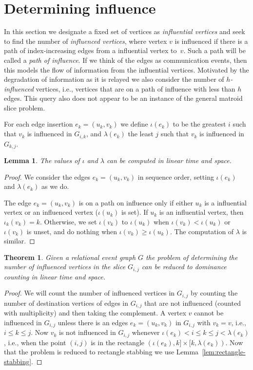\documentclass[11pt]{article}
\newtheorem{lemma}{Lemma}
\newtheorem{theorem}{Theorem}
\begin{document}
\section{Determining influence}
In this section we designate a fixed set of vertices as \emph{influential vertices} and seek to find the number of \emph{influenced vertices}, where vertex $v$ is influenced if there is a path of index-increasing edges from a influential vertex to~$v$. Such a path will be called a \emph{path of influence}. If we think of the edges as communication events, then this models the flow of information from the influential vertices. Motivated by the degradation of information as it is relayed we also consider the number of \emph{$h$-influenced} vertices, i.e., vertices that are on a path of influence with less than $h$ edges. This query also does not appear to be an instance of the general matroid slice problem.

For each edge insertion $e_k = (u_k, v_k)$ we define $\iota(e_k)$ to be the greatest $i$ such that $v_k$ is influenced in $G_{i, k}$, and $\lambda(e_k)$ the least $j$ such that $v_k$ is influenced in $G_{k, j}$.

\begin{lemma}\label{lem:influence}
The values of $\iota$ and $\lambda$ can be computed in linear time and space.
\end{lemma}
\begin{proof}
We consider the edges $e_k = (u_k, v_k)$ in sequence order, setting $\iota(e_k)$ and $\lambda(e_k)$ as we do.

The edge $e_k = (u_k, v_k)$ is on a path on influence only if either $u_k$ is a influential vertex or an influenced vertex ($\iota(u_k)$ is set). If $u_k$ is an influential vertex, then $\iota_{k}(v_k) = k$. Otherwise, we set $\iota(v_k)$ to $\iota(u_k)$ when $\iota(v_k) < \iota(u_k)$ or $\iota(v_k)$ is unset, and do nothing when $\iota(v_k) \geq \iota(u_k)$. The computation of $\lambda$ is similar.
\end{proof}

\begin{theorem}\label{thm:influence}
Given a relational event graph $G$ the problem of determining the number of influenced vertices in the slice $G_{i,j}$ can be reduced to dominance counting in linear time and space.
\end{theorem}
\begin{proof}
We will count the number of influenced vertices in $G_{i,j}$ by counting the number of destination vertices of edges in $G_{i,j}$ that are not influenced (counted with multiplicity) and then taking the complement. A vertex $v$ cannot be influenced in $G_{i,j}$ unless there is an edges $e_k = (u_k, v_k)$ in $G_{i,j}$ with $v_k = v$, i.e., $i \leq k \leq j$. Now $v_k$ is not influenced in $G_{i,j}$ whenever $\iota(e_k) < i \leq k \leq j < \lambda(e_k)$, i.e., when the point $(i,j)$ is in the rectangle $(\iota(e_k), k] \times [k, \lambda(e_k))$. Now that the problem is reduced to rectangle stabbing we use Lemma~\ref{lem:rectangle-stabbing}.
\end{proof}
\end{document}
